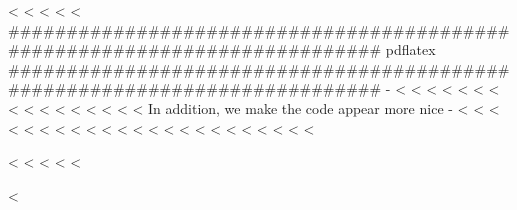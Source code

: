 <%
<%
<%
\else
<%
<%
###########################################################################
pdflatex
###########################################################################
-%
<%
<%
<%
<%
<%
<%
<%
<%
<%
<%
<%
<%
<%
<%
<%
<%
In addition, we make the code appear more nice -%
<%
<%
<%
<%
<%
<%
<%
<%
<%
<%
<%
<%
<%
<%
<%
<%
<%
<%
<%
<%
<%
<%
<%

<%
<%
<%
\fi
<%
<%

<%

